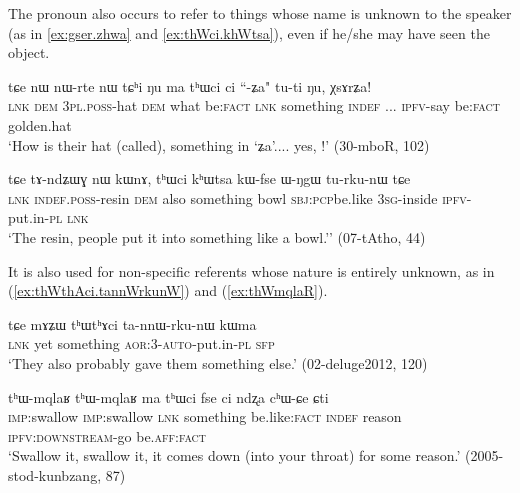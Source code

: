 The pronoun  also occurs to refer to things whose name is unknown to the speaker (as in \ref{ex:gser.zhwa} and \ref{ex:thWci.khWtsa}), even if he/she may have seen the object.
 
\begin{exe}
\ex \label{ex:gser.zhwa}
\gll tɕe nɯ nɯ-rte nɯ tɕʰi ŋu ma tʰɯci ci ``-ʑa" tu-ti ŋu, χsɤrʑa! \\
\textsc{lnk} \textsc{dem} \textsc{3pl}.\textsc{poss}-hat \textsc{dem} what be:\textsc{fact} \textsc{lnk} something \textsc{indef} {  ...} \textsc{ipfv}-say be:\textsc{fact} golden.hat \\
\glt `How is their hat (called), something in `ʑa'.... yes, !' (30-mboR, 102)
\end{exe}

\begin{exe}
\ex \label{ex:thWci.khWtsa}
\gll  tɕe tɤ-ndʑɯɣ nɯ kɯnɤ, tʰɯci kʰɯtsa kɯ-fse ɯ-ŋgɯ tu-rku-nɯ tɕe   \\
\textsc{lnk} \textsc{indef}.\textsc{poss}-resin \textsc{dem} also something bowl \textsc{sbj}:\textsc{pcp}be.like \textsc{3sg}-inside \textsc{ipfv}-put.in-\textsc{pl} \textsc{lnk}   \\
\glt `The resin, people put it into something like a bowl.'' (07-tAtho, 44)
\end{exe}

It is also used for non-specific referents whose nature is entirely unknown, as in  (\ref{ex:thWthAci.tannWrkunW}) and (\ref{ex:thWmqlaR}).

\begin{exe}
\ex \label{ex:thWthAci.tannWrkunW}
\gll   tɕe mɤʑɯ tʰɯtʰɤci ta-nnɯ-rku-nɯ kɯma  \\
\textsc{lnk} yet something \textsc{aor}:3\flobv{}-\textsc{auto}-put.in-\textsc{pl} \textsc{sfp} \\
\glt `They also probably gave them something else.' (02-deluge2012, 120)
 \end{exe}
 
  \begin{exe}
\ex \label{ex:thWmqlaR}
\gll  tʰɯ-mqlaʁ tʰɯ-mqlaʁ ma tʰɯci fse ci ndʐa cʰɯ-ɕe ɕti \\
 \textsc{imp}:swallow  \textsc{imp}:swallow \textsc{lnk} something be.like:\textsc{fact} \textsc{indef} reason \textsc{ipfv}:\textsc{downstream}-go be.\textsc{aff}:\textsc{fact} \\
\glt `Swallow it, swallow it, it comes down (into your throat) for some reason.' (2005-stod-kunbzang, 87)
  \end{exe}

